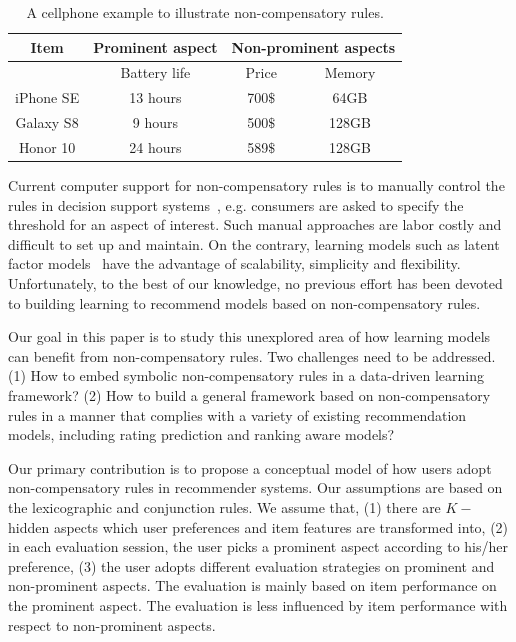 \documentclass[letterpaper]{article} %
\begin{document}
\begin{table}[htp]
\caption{A cellphone example to illustrate non-compensatory rules.}
\scriptsize
\begin{center}
\begin{tabular}{|c|c|c|c|}
\hline
Item & Prominent aspect & \multicolumn{2}{|c|}{Non-prominent aspects}\\\hline
& Battery life &  Price & Memory \\\hline
iPhone SE &  13 hours & 700$\$$ & 64GB  \\\hline
Galaxy S8 & 9 hours& 500$\$$  & 128GB \\\hline
Honor 10 & 24 hours& 589$\$$ & 128GB \\\hline
\end{tabular}
\end{center}
\label{tab:example}
\end{table}
Current computer support for non-compensatory rules is to manually control the rules in decision support systems~\cite{Lee2009Transforming}, e.g. consumers are asked to specify the threshold for an aspect of interest. Such manual approaches are labor costly and difficult to set up and maintain. On the contrary, learning models such as latent factor models~\cite{Koren2009Matrix} have the advantage of scalability, simplicity and flexibility. Unfortunately, to the best of our knowledge, no previous effort has been devoted to building learning to recommend models based on non-compensatory rules. 

Our goal in this paper is to study this unexplored area of how learning models can benefit from non-compensatory rules. Two challenges need to be addressed. (1) How to embed symbolic non-compensatory rules in a data-driven learning framework? (2) How to build a general framework based on non-compensatory rules in a manner that complies with a variety of existing recommendation models, including rating prediction and ranking aware models?  

Our primary contribution is to propose a conceptual model of how users adopt non-compensatory rules in recommender systems. Our assumptions are based on the lexicographic and conjunction rules. We assume that, (1) there are $K-$ hidden aspects which  user preferences and item features are transformed into, (2) in each evaluation session, the user picks a prominent aspect according to his/her preference, (3) the user adopts different evaluation strategies on prominent and non-prominent aspects. The evaluation is mainly based on item performance on the prominent aspect. The evaluation is less influenced by item performance with respect to non-prominent aspects.
\end{document}
